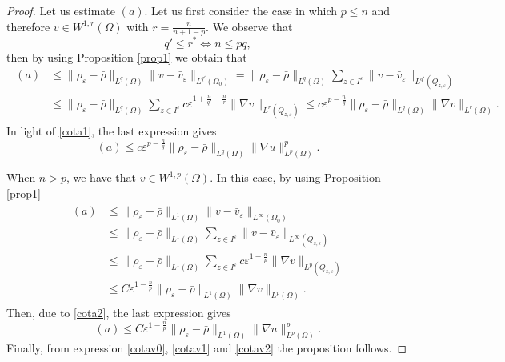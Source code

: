 \documentclass[12pt]{amsart}
\theoremstyle{definition}
\theoremstyle{remark}
\numberwithin{equation}{section}
\begin{document}
\begin{proof}
Let us estimate $(a)$.  Let us first consider the case in which $p\leq n$ and therefore $v\in W^{1,r}(\Omega)$ with $r= \frac{n}{n+1-p}$. We observe that
$$
q'\leq r^* \iff n\leq pq,
$$
then by using Proposition \ref{prop1} we obtain that
\begin{align*}
\begin{split}
(a) &\leq \|\rho_\varepsilon - \bar \rho\|_{L^q(\Omega)} \| v- \bar v_\varepsilon\|_{L^{q'}(\Omega_0)} = \|\rho_\varepsilon - \bar \rho\|_{L^q(\Omega)}\sum_{z\in I^\varepsilon } \|v-\bar v_\varepsilon\|_{ L^{q'}(Q_{z,\varepsilon})} \\
&\leq   \|\rho_\varepsilon - \bar \rho\|_{L^q(\Omega)} \sum_{z\in I^\varepsilon } c\varepsilon^{1+\frac{n}{q'}-\frac{n}{r}} \|\nabla v\|_{L^r(Q_{z,\varepsilon})}\leq c\varepsilon^{p-\frac{n}{q} }   \|\rho_\varepsilon - \bar \rho\|_{L^q(\Omega)}  \|\nabla v\|_{L^r(\Omega)}.
\end{split}
\end{align*}
In light of \eqref{cota1}, the last expression gives 
\begin{equation} \label{cotav1}
(a) \leq c\varepsilon^{p-\frac{n}{q} }   \|\rho_\varepsilon - \bar \rho\|_{L^q(\Omega)}  \|\nabla u\|_{L^p(\Omega)}^p.
\end{equation}


When $n>p$, we have that $v\in W^{1,p}(\Omega)$. In this case, by using Proposition \ref{prop1} 
\begin{align*}
\begin{split}
(a) &\leq \|\rho_\varepsilon - \bar \rho\|_{L^1(\Omega)} \| v- \bar v_\varepsilon\|_{L^{\infty}(\Omega_0)} \\
&\leq \|\rho_\varepsilon - \bar \rho\|_{L^1(\Omega)}\sum_{z\in I^\varepsilon } \|v-\bar v_\varepsilon\|_{ L^\infty(Q_{z,\varepsilon})} \\
&\leq   \|\rho_\varepsilon - \bar \rho\|_{L^1(\Omega)} \sum_{z\in I^\varepsilon } c\varepsilon^{1-\frac{n}{p}} \|\nabla v\|_{L^p(Q_{z,\varepsilon})}\\
&\leq C\varepsilon^{1-\frac{n}{p} }   \|\rho_\varepsilon - \bar \rho\|_{L^1(\Omega)}  \|\nabla v\|_{L^p(\Omega)}.
\end{split}
\end{align*}
Then, due to \eqref{cota2}, the last expression gives
\begin{equation} \label{cotav2}
(a)\leq C\varepsilon^{1-\frac{n}{p} }   \|\rho_\varepsilon - \bar \rho\|_{L^1(\Omega)}  \|\nabla u\|_{L^p(\Omega)}^p.
\end{equation}
Finally, from  expression \eqref{cotav0}, \eqref{cotav1} and \eqref{cotav2} the proposition follows.
\end{proof}
\end{document}
